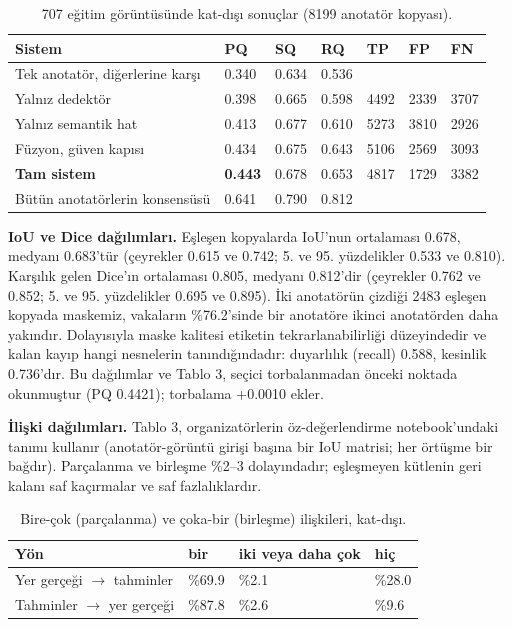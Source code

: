 \begin{table}[t]
\centering\footnotesize
\caption{707 eğitim görüntüsünde kat-dışı sonuçlar (8199 anotatör kopyası).}
\begin{tabular}{@{}lllllll@{}}
\toprule
Sistem & PQ & SQ & RQ & TP & FP & FN \\
\midrule
Tek anotatör, diğerlerine karşı & 0.340 & 0.634 & 0.536 & & & \\
Yalnız dedektör & 0.398 & 0.665 & 0.598 & 4492 & 2339 & 3707 \\
Yalnız semantik hat & 0.413 & 0.677 & 0.610 & 5273 & 3810 & 2926 \\
Füzyon, güven kapısı & 0.434 & 0.675 & 0.643 & 5106 & 2569 & 3093 \\
\textbf{Tam sistem} & \textbf{0.443} & 0.678 & 0.653 & 4817 & 1729 & 3382 \\
Bütün anotatörlerin konsensüsü & 0.641 & 0.790 & 0.812 & & & \\
\bottomrule
\end{tabular}
\end{table}

\textbf{IoU ve Dice dağılımları.} Eşleşen kopyalarda IoU'nun ortalaması 0.678, medyanı 0.683'tür
(çeyrekler 0.615 ve 0.742; 5. ve 95. yüzdelikler 0.533 ve 0.810). Karşılık gelen Dice'ın
ortalaması 0.805, medyanı 0.812'dir (çeyrekler 0.762 ve 0.852; 5. ve 95. yüzdelikler 0.695 ve
0.895). İki anotatörün çizdiği 2483 eşleşen kopyada maskemiz, vakaların \%76.2'sinde bir anotatöre
ikinci anotatörden daha yakındır. Dolayısıyla maske kalitesi etiketin tekrarlanabilirliği
düzeyindedir ve kalan kayıp hangi nesnelerin tanındığındadır: duyarlılık (recall) 0.588, kesinlik
0.736'dır. Bu dağılımlar ve Tablo 3, seçici torbalanmadan önceki noktada okunmuştur (PQ 0.4421);
torbalama +0.0010 ekler.

\textbf{İlişki dağılımları.} Tablo 3, organizatörlerin öz-değerlendirme notebook'undaki tanımı
kullanır (anotatör-görüntü girişi başına bir IoU matrisi; her örtüşme bir bağdır). Parçalanma ve
birleşme \%2--3 dolayındadır; eşleşmeyen kütlenin geri kalanı saf kaçırmalar ve saf fazlalıklardır.

\begin{table}[t]
\centering\footnotesize
\caption{Bire-çok (parçalanma) ve çoka-bir (birleşme) ilişkileri, kat-dışı.}
\begin{tabular}{@{}llll@{}}
\toprule
Yön & bir & iki veya daha çok & hiç \\
\midrule
Yer gerçeği $\rightarrow$ tahminler & \%69.9 & \%2.1 & \%28.0 \\
Tahminler $\rightarrow$ yer gerçeği & \%87.8 & \%2.6 & \%9.6 \\
\bottomrule
\end{tabular}
\end{table}

